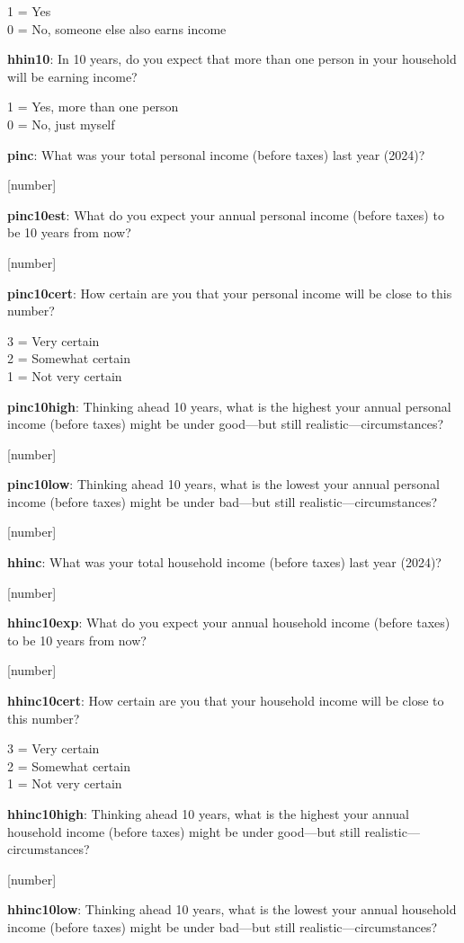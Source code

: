 \documentclass[11pt, headsepline]{article}
\begin{document}
1 = Yes \\
0 = No, someone else also earns income

\textbf{hhin10}: In 10 years, do you expect that more than one person in your household will be earning income?

1 = Yes, more than one person \\
0 = No, just myself

\textbf{pinc}: What was your total personal income (before taxes) last year (2024)?

[number]

\textbf{pinc10est}: What do you expect your annual personal income (before taxes) to be 10 years from now?

[number]

\textbf{pinc10cert}: How certain are you that your personal income will be close to this number?

3 = Very certain \\
2 = Somewhat certain \\
1 = Not very certain

\textbf{pinc10high}: Thinking ahead 10 years, what is the highest your annual personal income (before taxes) might be under good—but still realistic—circumstances?

[number]

\textbf{pinc10low}: Thinking ahead 10 years, what is the lowest your annual personal income (before taxes) might be under bad—but still realistic—circumstances?

[number]

\textbf{hhinc}: What was your total household income (before taxes) last year (2024)?

[number]

\textbf{hhinc10exp}: What do you expect your annual household income (before taxes) to be 10 years from now?

[number]

\textbf{hhinc10cert}: How certain are you that your household income will be close to this number?

3 = Very certain \\
2 = Somewhat certain \\
1 = Not very certain

\textbf{hhinc10high}: Thinking ahead 10 years, what is the highest your annual household income (before taxes) might be under good—but still realistic—circumstances?

[number]

\textbf{hhinc10low}: Thinking ahead 10 years, what is the lowest your annual household income (before taxes) might be under bad—but still realistic—circumstances?
\end{document}
